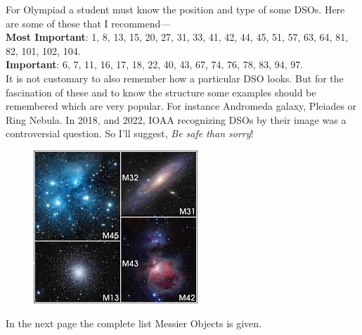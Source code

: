 \documentclass[a4paper,12pt]{extarticle}
\begin{document}
For Olympiad a student must know the position and type of some DSOs. Here are some of these that I recommend---\\

\textbf{Most Important}: {\color{red} 1, 8, 13, 15, 20, 27, 31, 33, 41, 42, 44, 45, 51, 57, 63, 64, 81, 82, 101, 102, 104.}\\

\textbf{Important}: 6, 7, 11, 16, 17, 18, 22, 40, 43, 67, 74, 76, 78, 83, 94, 97.\\

It is not customary to also remember how a particular DSO looks. But for the fascination of these and to know the structure some examples should be remembered which are very popular. For instance Andromeda galaxy, Pleiades or Ring Nebula. In 2018,  and 2022,  IOAA recognizing DSOs by their image was a controversial question. So I'll suggest, \textit{Be safe than sorry}!  

\begin{figure}[H]
    \centering
    \includegraphics[width=0.5\linewidth]{m_o.jpg}
\end{figure}

In the next page the complete list Messier Objects is given. 
\end{document}
